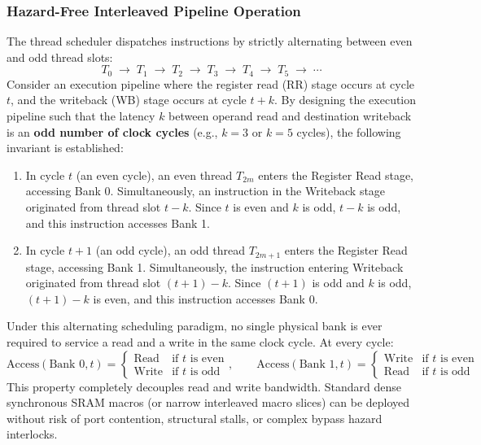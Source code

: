 \subsubsection{Hazard-Free Interleaved Pipeline Operation}
The thread scheduler dispatches instructions by strictly alternating between even and odd thread slots:
\begin{equation}
T_0 \;\longrightarrow\; T_1 \;\longrightarrow\; T_2 \;\longrightarrow\; T_3 \;\longrightarrow\; T_4 \;\longrightarrow\; T_5 \;\longrightarrow\; \cdots
\end{equation}
Consider an execution pipeline where the register read (RR) stage occurs at cycle $t$, and the writeback (WB) stage occurs at cycle $t + k$. By designing the execution pipeline such that the latency $k$ between operand read and destination writeback is an \textbf{odd number of clock cycles} (e.g., $k = 3$ or $k = 5$ cycles), the following invariant is established:
\begin{enumerate}
    \item In cycle $t$ (an even cycle), an even thread $T_{2m}$ enters the Register Read stage, accessing Bank 0. Simultaneously, an instruction in the Writeback stage originated from thread slot $t - k$. Since $t$ is even and $k$ is odd, $t - k$ is odd, and this instruction accesses Bank 1.
    
    \item In cycle $t+1$ (an odd cycle), an odd thread $T_{2m+1}$ enters the Register Read stage, accessing Bank 1. Simultaneously, the instruction entering Writeback originated from thread slot $(t+1) - k$. Since $(t+1)$ is odd and $k$ is odd, $(t+1) - k$ is even, and this instruction accesses Bank 0.
\end{enumerate}
Under this alternating scheduling paradigm, no single physical bank is ever required to service a read and a write in the same clock cycle. At every cycle:
\begin{equation}
\text{Access}(\text{Bank 0}, t) = \begin{cases} \text{Read} & \text{if } t \text{ is even} \\ \text{Write} & \text{if } t \text{ is odd} \end{cases}, \qquad \text{Access}(\text{Bank 1}, t) = \begin{cases} \text{Write} & \text{if } t \text{ is even} \\ \text{Read} & \text{if } t \text{ is odd} \end{cases}
\end{equation}
This property completely decouples read and write bandwidth. Standard dense synchronous SRAM macros (or narrow interleaved macro slices) can be deployed without risk of port contention, structural stalls, or complex bypass hazard interlocks.

